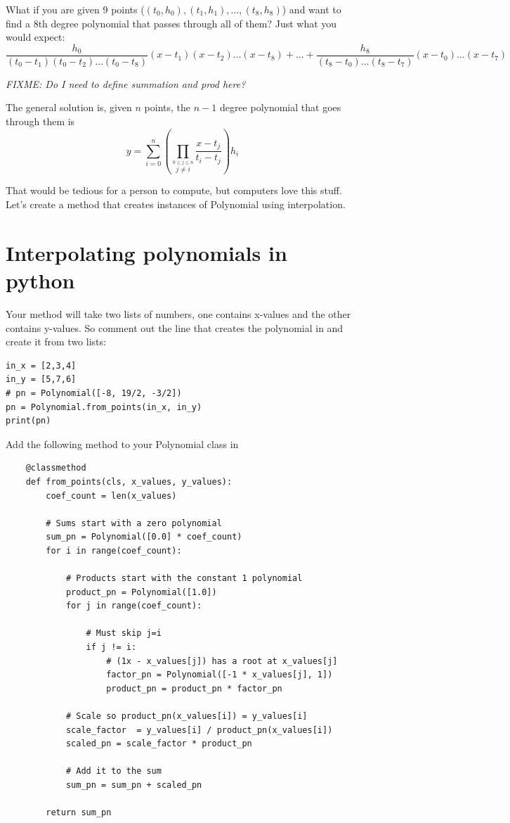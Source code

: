 What if you are given 9 points ($(t_0, h_0), (t_1, h_1), \ldots, (t_8,
h_8)$) and want to find a 8th degree polynomial that passes through
all of them? Just what you would expect:
\begin{equation*}
\frac{h_0}{(t_0 - t_1)(t_0 - t_2)\ldots(t_0 - t_8)}(x - t_1)(x - t_2)\ldots(x - t_8) + \ldots + \frac{h_8}{(t_8 - t_0)\ldots(t_8-t_7)}(x - t_0)\dots(x - t_7)
\end{equation*}

\textit{FIXME: Do I need to define summation and prod here?}

The general solution is, given $n$ points, the $n-1$ degree polynomial that goes through them is
\begin{equation*}
  y =\sum_{i=0}^{n}\left ( \prod_{\stackrel{\!0\leq j\leq n}{j\neq i}}\frac{x-t_j}{t_i-t_j}\right ) h_i
\end{equation*}

That would be tedious for a person to compute, but computers love this
stuff. Let's create a method that creates instances of Polynomial
using interpolation.

\section{Interpolating polynomials in python}

Your method will take two lists of numbers, one contains x-values and
the other contains y-values. So comment out the line that creates the
polynomial in  and create it from two lists:
\begin{Verbatim}
in_x = [2,3,4]
in_y = [5,7,6]
# pn = Polynomial([-8, 19/2, -3/2])
pn = Polynomial.from_points(in_x, in_y)
print(pn)
\end{Verbatim}

Add the following method to your Polynomial class in 
\begin{Verbatim}
    @classmethod
    def from_points(cls, x_values, y_values):
        coef_count = len(x_values)

        # Sums start with a zero polynomial
        sum_pn = Polynomial([0.0] * coef_count)
        for i in range(coef_count):

            # Products start with the constant 1 polynomial
            product_pn = Polynomial([1.0])
            for j in range(coef_count):

                # Must skip j=i
                if j != i:
                    # (1x - x_values[j]) has a root at x_values[j]
                    factor_pn = Polynomial([-1 * x_values[j], 1])
                    product_pn = product_pn * factor_pn
                    
            # Scale so product_pn(x_values[i]) = y_values[i]
            scale_factor  = y_values[i] / product_pn(x_values[i])
            scaled_pn = scale_factor * product_pn

            # Add it to the sum
            sum_pn = sum_pn + scaled_pn
            
        return sum_pn  
\end{Verbatim}

